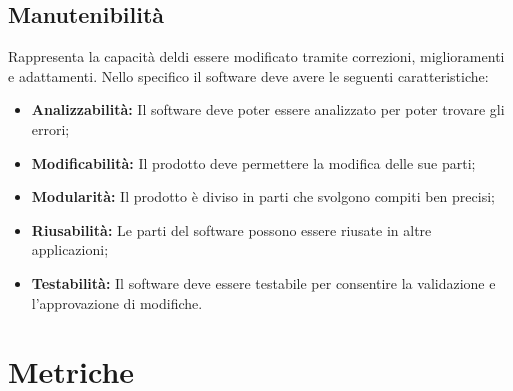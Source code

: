 \subsection{Manutenibilità}
Rappresenta la capacità deldi essere modificato tramite correzioni, miglioramenti e adattamenti.
Nello specifico il software deve avere le seguenti caratteristiche:
\begin{itemize}
	\item \textbf{Analizzabilità:} Il software deve poter essere analizzato per poter trovare gli errori;
	\item \textbf{Modificabilità:} Il prodotto deve permettere la modifica delle sue parti;
	\item \textbf{Modularità:} Il prodotto è diviso in parti che svolgono compiti ben precisi;
	\item \textbf{Riusabilità:} Le parti del software possono essere riusate in altre applicazioni;
	\item \textbf{Testabilità:} Il software deve essere testabile per consentire la validazione e l'approvazione di modifiche.
\end{itemize}	

\section{Metriche}